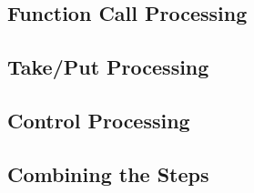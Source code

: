 \subsection{Function Call Processing}
\label{imp-post-funcall}

\subsection{Take/Put Processing}
\label{imp-post-takeput}

\subsection{Control Processing}
\label{imp-post-control}

\subsection{Combining the Steps}
\label{imp-post-combine}

